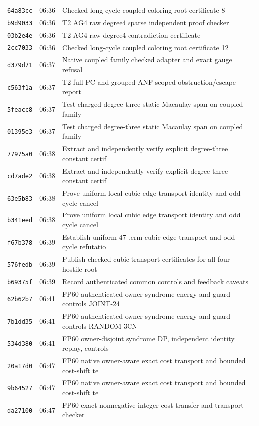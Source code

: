 \documentclass[11pt]{article}
\theoremstyle{definition}
\theoremstyle{remark}
\begin{document}
\begin{longtable}{llp{11.5cm}}
\texttt{64a83cc} & 06:36 & Checked long-cycle coupled coloring root certificate 8\\
\texttt{b9d9033} & 06:36 & T2 AG4 raw degree4 sparse independent proof checker\\
\texttt{03b2e4e} & 06:36 & T2 AG4 raw degree4 contradiction certificate\\
\texttt{2cc7033} & 06:36 & Checked long-cycle coupled coloring root certificate 12\\
\texttt{d379d71} & 06:37 & Native coupled family checked adapter and exact gauge refusal\\
\texttt{c563f1a} & 06:37 & T2 full PC and grouped ANF scoped obstruction/escape report\\
\texttt{5feacc8} & 06:37 & Test charged degree-three static Macaulay span on coupled family\\
\texttt{01395e3} & 06:37 & Test charged degree-three static Macaulay span on coupled family\\
\texttt{77975a0} & 06:38 & Extract and independently verify explicit degree-three constant certif\\
\texttt{cd7ade2} & 06:38 & Extract and independently verify explicit degree-three constant certif\\
\texttt{63e5b83} & 06:38 & Prove uniform local cubic edge transport identity and odd cycle cancel\\
\texttt{b341eed} & 06:38 & Prove uniform local cubic edge transport identity and odd cycle cancel\\
\texttt{f67b378} & 06:39 & Establish uniform 47-term cubic edge transport and odd-cycle refutatio\\
\texttt{576fedb} & 06:39 & Publish checked cubic transport certificates for all four hostile root\\
\texttt{b69375f} & 06:39 & Record authenticated common controls and feedback caveats\\
\texttt{62b62b7} & 06:41 & FP60 authenticated owner-syndrome energy and guard controls JOINT-24\\
\texttt{7b1dd35} & 06:41 & FP60 authenticated owner-syndrome energy and guard controls RANDOM-3CN\\
\texttt{534d380} & 06:41 & FP60 owner-disjoint syndrome DP, independent identity replay, controls\\
\texttt{20a17d0} & 06:47 & FP60 native owner-aware exact cost transport and bounded cost-shift te\\
\texttt{9b64527} & 06:47 & FP60 native owner-aware exact cost transport and bounded cost-shift te\\
\texttt{da27100} & 06:47 & FP60 exact nonnegative integer cost transfer and transport checker\\\bottomrule
\end{longtable}
\end{document}
